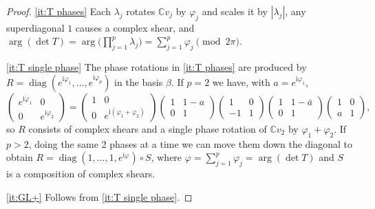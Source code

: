 \documentclass[10pt,a4paper]{amsart}
\def\C			{\mathds{C}}
\DeclareMathOperator{\diag}{diag}
\def\im	 					{\mathrm{i}}				%
\begin{document}
\begin{proof}
	\ref{it:T phases} 
	Each $\lambda_j$ rotates $\C v_j$ by $\varphi_j$ and scales it by $|\lambda_j|$,
	any superdiagonal $1$ causes a complex shear, and $\arg(\det T) = \arg\big(\prod_{j=1}^p \lambda_j\big) = \sum_{j=1}^p \varphi_j \pmod{2\pi}$.
	
	\ref{it:T single phase} The phase rotations in \ref{it:T phases} are produced by $R = \diag(e^{\im \varphi_1},\ldots,e^{\im \varphi_p})$ in the basis $\beta$. If $p=2$ we have, with $a = e^{\im \varphi_1}$,
	\begin{equation*}
		\begin{pmatrix}
			e^{\im \varphi_1} & 0 \\
			0 & e^{\im \varphi_2}
		\end{pmatrix} =
		\begin{pmatrix}
			1 & 0 \\
			0 & e^{\im (\varphi_1+\varphi_2)}
		\end{pmatrix}
		\begin{pmatrix}
			1 & 1-a \\
			0 & 1
		\end{pmatrix}
		\begin{pmatrix}
			1 & 0 \\
			-1 & 1
		\end{pmatrix}
		\begin{pmatrix}
			1 & 1-\bar{a} \\
			0 & 1
		\end{pmatrix}
		\begin{pmatrix}
			1 & 0 \\
			a & 1
		\end{pmatrix},	
	\end{equation*}
	so $R$ consists of complex shears and a single phase rotation of $\C v_2$ by $\varphi_1+\varphi_2$.
	If $p>2$, doing the same 2 phases at a time we can move them down the diagonal to obtain $R = \diag(1,\ldots,1,e^{\im\varphi}) \circ S$, where $\varphi = \sum_{j=1}^p \varphi_j = \arg(\det T)$
	and $S$ is a composition of complex shears.
	
	\ref{it:GL+} Follows from \ref{it:T single phase}.
\end{proof}
\end{document}
